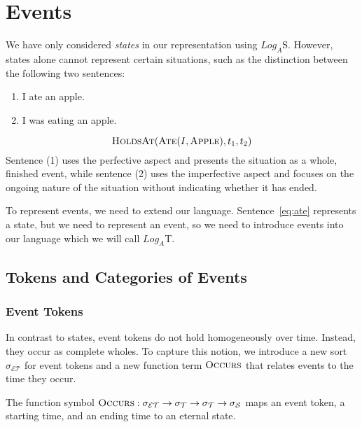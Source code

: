 \chapter{Events}

We have only considered \textit{states} in our representation using $Log_A$S. However, states alone cannot represent certain situations, such as the distinction between the following two sentences:

\begin{enumerate}[label=(\arabic*)]
	\item I ate an apple.
	\item I was eating an apple.
\end{enumerate}

\begin{equation}
	\textsc{HoldsAt}(\textsc{Ate}(I, \textsc{Apple}), t_1, t_2)
	\label{eq:ate}
\end{equation}
Sentence (1) uses the perfective aspect and presents the situation as a whole, finished event, while sentence (2) uses the imperfective aspect and focuses on the ongoing nature of the situation without indicating whether it has ended.

To represent events, we need to extend our language. Sentence~\ref{eq:ate} represents a state, but we need to represent an event, so we need to introduce events into our language
which we will call $Log_A$T.

\section{Tokens and Categories of Events}
\subsection{Event Tokens}

In contrast to states, event tokens do not hold homogeneously over time.
Instead, they occur as complete wholes.
To capture this notion, we introduce a new sort $\sigma_\mathcal{ET}$ for event tokens and a new function term $\textsc{Occurs}$ that relates events to the time they occur.

The function symbol $\textsc{Occurs}: \sigma_\mathcal{ET} \to \sigma_\mathcal{T} \to \sigma_\mathcal{T} \to \sigma_\mathcal{S}$ maps an event token,
a starting time, and an ending time to an eternal state.

